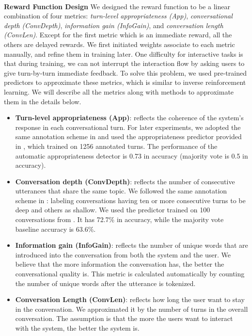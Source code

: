\documentclass[11pt]{article}
\newcommand{\dk}[1]{{\color{red} #1}}
\begin{document}
\\
\noindent\textbf{Reward Function Design}
We designed the reward function to be a linear combination of four metrics: \textit{turn-level appropriateness (App)}, \textit{conversational depth (ConvDepth)}, \textit{information gain (InfoGain)}, and \textit{conversation length (ConvLen)}. Except for the first metric which is an immediate reward, all the others are delayed rewards. We first initiated weights associate to each metric manually, and refine them in training later. One difficulty for interactive tasks is that during training, we can not interrupt the interaction flow by asking users to give turn-by-turn immediate feedback. To solve this problem, we used pre-trained predictors to approximate these metrics, which is similar to inverse reinforcement learning. We will describe all the metrics along with methods to approximate them in the details below. 

\begin{itemize}
    

\item \textbf{Turn-level appropriateness (App)}: reflects the coherence of the system's response in each conversational turn. For later experiments, we adopted the same annotation scheme in \cite{lrec} and used the appropriateness predictor provided in \cite{yu2016sigdial}, which trained on 1256 annotated turns. %
The performance of the automatic appropriateness detector is 0.73 in accuracy (majority vote is 0.5 in accuracy). 

\item \textbf{Conversation depth (ConvDepth)}: reflects the number of consecutive utterances that share the same topic. We followed the same annotation scheme in \cite{yu2016sigdial}: labeling conversations having ten or more consecutive turns to be deep and others as shallow. We used the predictor trained on 100 conversations from \cite{yu2016sigdial}. It has 72.7\% in accuracy, while the majority vote baseline accuracy is 63.6\%. 

\item\textbf{Information gain (InfoGain)}: reflects the number of unique words that are introduced into the conversation from both the system and the user. We believe that the more information the conversation has, the better the conversational quality is. This metric is calculated automatically by counting the number of unique words after the utterance is tokenized. %

\item\textbf{Conversation Length (ConvLen)}: reflects how long the user want to stay in the conversation. We approximated it by the number of turns in the overall conversation. The assumption is that the more the users want to interact with the system, the better the system is.
\end{itemize}
\end{document}
